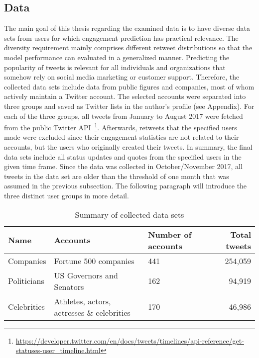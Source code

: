 \subsection{Data}
\label{sec:data_collection}

The main goal of this thesis regarding the examined data is to have diverse
data sets from users for which engagement prediction has practical relevance.
The diversity requirement mainly comprises different retweet distributions
so that the model performance can evaluated in a generalized manner.
Predicting the popularity of tweets is relevant for all individuals and
organizations that somehow rely on social media marketing or customer support.
Therefore, the collected data sets include data from public figures and
companies, most of whom actively maintain a Twitter account.
The selected accounts were separated into three groups and saved as Twitter lists
in the author's profile (see Appendix).
For each of the three groups, all tweets from January to August 2017 were
fetched from the public Twitter API~\footnote{\url{https://developer.twitter.com/en/docs/tweets/timelines/api-reference/get-statuses-user_timeline.html}}.
Afterwards, retweets that the specified users made were excluded since their
engagement statistics are not related to their accounts, but the users who
originally created their tweets.
In summary, the final data sets include all status updates and quotes from the
specified users in the given time frame.
Since the data was collected in October/November 2017, all tweets in the data
set are older than the threshold of one month that was assumed in the previous
subsection.
The following paragraph will introduce the three distinct user groups in more
detail.

\begin{table}
\centering
\begin{tabular}{lllr}
\toprule
Name & Accounts & Number of accounts & Total tweets \\
\midrule
Companies & Fortune 500 companies & 441 & 254,059 \\
Politicians & US Governors and Senators & 162 & 94,919 \\
Celebrities & Athletes, actors, actresses \& celebrities & 170 & 46,986 \\
\bottomrule
\end{tabular}
\caption{Summary of collected data sets}
\label{tab:dataset_summary}
\end{table}

